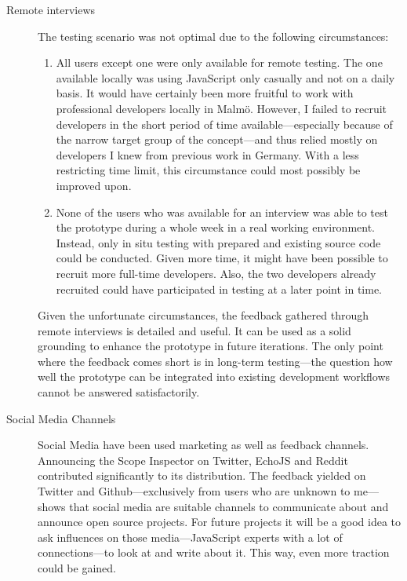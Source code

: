 \begin{description}
\item[Remote interviews]
The testing scenario was not optimal due to the following circumstances:

\begin{enumerate}
\def\labelenumi{\arabic{enumi}.}
\itemsep1pt\parskip0pt
\item
  All users except one were only available for remote testing. The one
  available locally was using JavaScript only casually and not on a
  daily basis. It would have certainly been more fruitful to work with
  professional developers locally in Malmö. However, I failed to recruit
  developers in the short period of time available—especially because of
  the narrow target group of the concept—and thus relied mostly on
  developers I knew from previous work in Germany. With a less
  restricting time limit, this circumstance could most possibly be
  improved upon.
\item
  None of the users who was available for an interview was able to test
  the prototype during a whole week in a real working environment.
  Instead, only in situ testing with prepared and existing source code
  could be conducted. Given more time, it might have been possible to
  recruit more full-time developers. Also, the two developers already
  recruited could have participated in testing at a later point in time.
\end{enumerate}

Given the unfortunate circumstances, the feedback gathered through
remote interviews is detailed and useful. It can be used as a solid
grounding to enhance the prototype in future iterations. The only point
where the feedback comes short is in long-term testing—the question how
well the prototype can be integrated into existing development workflows
cannot be answered satisfactorily.
\item[Social Media Channels]
Social Media have been used marketing as well as feedback channels.
Announcing the Scope Inspector on Twitter, EchoJS and Reddit contributed
significantly to its distribution. The feedback yielded on Twitter and
Github—exclusively from users who are unknown to me—shows that social
media are suitable channels to communicate about and announce open
source projects. For future projects it will be a good idea to ask
influences on those media—JavaScript experts with a lot of
connections—to look at and write about it. This way, even more traction
could be gained.
\end{description}

